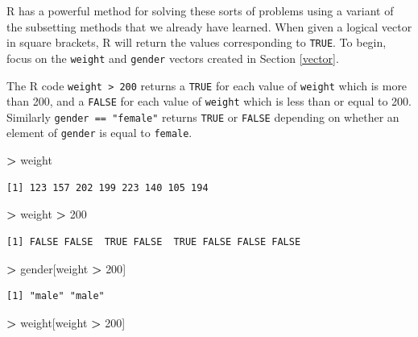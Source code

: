 \documentclass[
]{krantz}
\makeatletter
\newenvironment{Shaded}{\begin{snugshade}}{\end{snugshade}}
\newcommand{\DecValTok}[1]{\textcolor[rgb]{0.06,0.06,0.06}{#1}}
\newcommand{\NormalTok}[1]{#1}
\newcommand{\OperatorTok}[1]{\textcolor[rgb]{0.43,0.43,0.43}{\textbf{#1}}}
\newcommand{\StringTok}[1]{\textcolor[rgb]{0.5,0.5,0.5}{#1}}
\newenvironment{kframe}{%
\medskip{}
\setlength{\fboxsep}{.8em}
 \def\at@end@of@kframe{}%
 \ifinner\ifhmode%
  \def\at@end@of@kframe{\end{minipage}}%
  \begin{minipage}{\columnwidth}%
 \fi\fi%
 \def\FrameCommand##1{\hskip\@totalleftmargin \hskip-\fboxsep
 \colorbox{shadecolor}{##1}\hskip-\fboxsep
     \hskip-\linewidth \hskip-\@totalleftmargin \hskip\columnwidth}%
 \MakeFramed {\advance\hsize-\width
   \@totalleftmargin\z@ \linewidth\hsize
   \@setminipage}}%
 {\par\unskip\endMakeFramed%
 \at@end@of@kframe}
\renewenvironment{Shaded}{\begin{kframe}}{\end{kframe}}
\makeatother
\begin{document}
R has a powerful method for solving these sorts of problems using a variant of the subsetting methods that we already have learned. When given a logical vector in square brackets, R will return the values corresponding to \texttt{TRUE}.
To begin, focus on the \texttt{weight} and \texttt{gender} vectors created in Section \ref{vector}.

The R code \texttt{weight\ \textgreater{}\ 200} returns a \texttt{TRUE} for each value of \texttt{weight} which is more than 200, and a \texttt{FALSE} for each value of \texttt{weight} which is less than or equal to 200. Similarly \texttt{gender\ ==\ "female"} returns \texttt{TRUE} or \texttt{FALSE} depending on whether an element of \texttt{gender} is equal to \texttt{female}.

\begin{Shaded}
\begin{Highlighting}[]
\OperatorTok{\textgreater{}}\StringTok{ }\NormalTok{weight}
\end{Highlighting}
\end{Shaded}

\begin{verbatim}
[1] 123 157 202 199 223 140 105 194
\end{verbatim}

\begin{Shaded}
\begin{Highlighting}[]
\OperatorTok{\textgreater{}}\StringTok{ }\NormalTok{weight }\OperatorTok{\textgreater{}}\StringTok{ }\DecValTok{200}
\end{Highlighting}
\end{Shaded}

\begin{verbatim}
[1] FALSE FALSE  TRUE FALSE  TRUE FALSE FALSE FALSE
\end{verbatim}

\begin{Shaded}
\begin{Highlighting}[]
\OperatorTok{\textgreater{}}\StringTok{ }\NormalTok{gender[weight }\OperatorTok{\textgreater{}}\StringTok{ }\DecValTok{200}\NormalTok{]}
\end{Highlighting}
\end{Shaded}

\begin{verbatim}
[1] "male" "male"
\end{verbatim}

\begin{Shaded}
\begin{Highlighting}[]
\OperatorTok{\textgreater{}}\StringTok{ }\NormalTok{weight[weight }\OperatorTok{\textgreater{}}\StringTok{ }\DecValTok{200}\NormalTok{]}
\end{Highlighting}
\end{Shaded}
\end{document}
